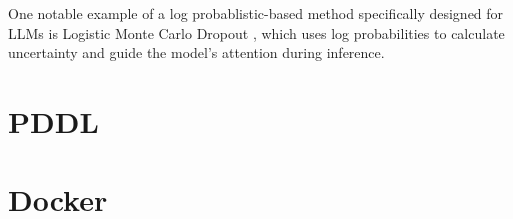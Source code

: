 One notable example of a log probablistic-based method specifically designed for
LLMs is Logistic Monte Carlo Dropout , which uses log probabilities to calculate
uncertainty and guide the model's attention during inference.

\section{PDDL}

\section{Docker}